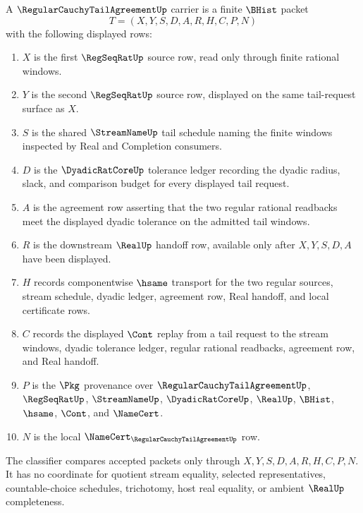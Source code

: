 \begin{definition}
\label{def:regular-cauchy-tail-agreement-carrier}
A $\RegularCauchyTailAgreementUp$ carrier is a finite $\BHist$ packet
$$
T=(X,Y,S,D,A,R,H,C,P,N)
$$
with the following displayed rows:
\begin{enumerate}
\item $X$ is the first $\RegSeqRatUp$ source row, read only through finite rational windows.
\item $Y$ is the second $\RegSeqRatUp$ source row, displayed on the same tail-request surface as $X$.
\item $S$ is the shared $\StreamNameUp$ tail schedule naming the finite windows inspected by Real and Completion consumers.
\item $D$ is the $\DyadicRatCoreUp$ tolerance ledger recording the dyadic radius, slack, and comparison budget for every displayed tail request.
\item $A$ is the agreement row asserting that the two regular rational readbacks meet the displayed dyadic tolerance on the admitted tail windows.
\item $R$ is the downstream $\RealUp$ handoff row, available only after $X,Y,S,D,A$ have been displayed.
\item $H$ records componentwise $\hsame$ transport for the two regular sources, stream schedule, dyadic ledger, agreement row, Real handoff, and local certificate rows.
\item $C$ records the displayed $\Cont$ replay from a tail request to the stream windows, dyadic tolerance ledger, regular rational readbacks, agreement row, and Real handoff.
\item $P$ is the $\Pkg$ provenance over $\RegularCauchyTailAgreementUp$, $\RegSeqRatUp$, $\StreamNameUp$, $\DyadicRatCoreUp$, $\RealUp$, $\BHist$, $\hsame$, $\Cont$, and $\NameCert$.
\item $N$ is the local $\NameCert_{\RegularCauchyTailAgreementUp}$ row.
\end{enumerate}
The classifier compares accepted packets only through $X,Y,S,D,A,R,H,C,P,N$. It has no coordinate for quotient stream equality, selected representatives, countable-choice schedules, trichotomy, host real equality, or ambient $\RealUp$ completeness.
\end{definition}

